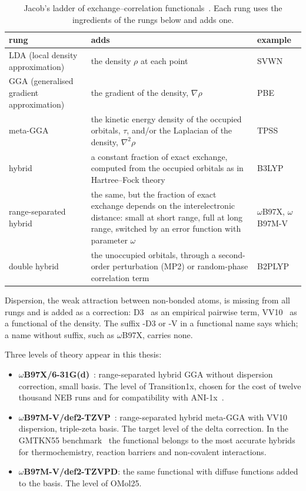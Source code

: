\begin{table}[h]
\centering
\caption{Jacob's ladder of exchange--correlation
functionals~\cite{perdew2001}. Each rung uses the ingredients of the rungs
below and adds one.}
\label{tab:functionals}
\begin{tabular}{@{}l p{7.4cm} l@{}}
\toprule
rung & adds & example \\
\midrule
LDA (local density approximation) & the density $\rho$ at each point & SVWN \\
GGA (generalised gradient approximation) & the gradient of the density, $\nabla\rho$ & PBE \\
meta-GGA & the kinetic energy density of the occupied orbitals, $\tau$,
  and/or the Laplacian of the density, $\nabla^2\rho$ & TPSS \\
hybrid & a constant fraction of exact exchange, computed from the occupied
  orbitals as in Hartree--Fock theory & B3LYP \\
range-separated hybrid & the same, but the fraction of exact exchange
  depends on the interelectronic distance: small at short range, full at
  long range, switched by an error function with parameter $\omega$ &
  $\omega$B97X, $\omega$B97M-V \\
double hybrid & the unoccupied orbitals, through a second-order
  perturbation (MP2) or random-phase correlation term & B2PLYP \\
\bottomrule
\end{tabular}
\end{table}

Dispersion, the weak attraction between non-bonded atoms, is missing from
all rungs and is added as a correction: D3~\cite{grimme2010} as an
empirical pairwise term, VV10~\cite{vydrov2010} as a functional of the
density. The suffix -D3 or -V in a functional name says which; a name
without suffix, such as $\omega$B97X, carries none.

Three levels of theory appear in this thesis:

\begin{itemize}
  \item \textbf{$\omega$B97X/6-31G(d)}~\cite{chai2008}: range-separated
    hybrid GGA without dispersion correction, small basis. The level of
    Transition1x, chosen for the cost of twelve thousand NEB runs and for
    compatibility with ANI-1x~\cite{schreiner2022}.
  \item \textbf{$\omega$B97M-V/def2-TZVP}~\cite{mardirossian2016}:
    range-separated hybrid meta-GGA with VV10 dispersion, triple-zeta
    basis. The target level of the delta correction. In the GMTKN55
    benchmark~\cite{goerigk2017} the functional belongs to the most
    accurate hybrids for thermochemistry, reaction barriers and
    non-covalent interactions.
  \item \textbf{$\omega$B97M-V/def2-TZVPD}: the same functional with
    diffuse functions added to the basis. The level of OMol25.
\end{itemize}


